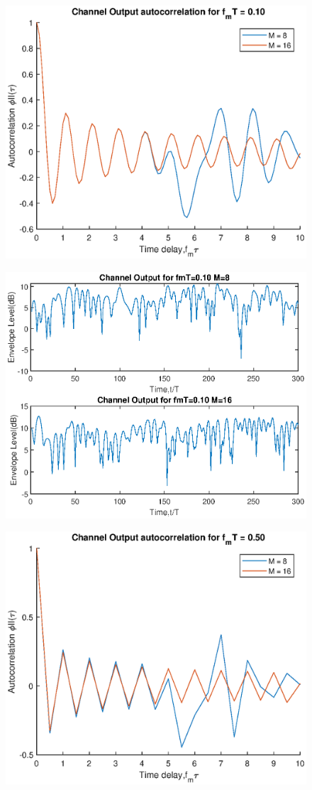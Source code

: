 \begin{figure}[H]
    \centering
    \includegraphics[scale = 0.9]{ss_auto_01.eps}
\end{figure}
\begin{figure}[H]
    \centering
    \includegraphics[scale = 0.9]{ss_envelop_01.eps}
\end{figure}
\begin{figure}[H]
    \centering
    \includegraphics[scale = 0.9]{ss_auto_05.eps}
\end{figure}